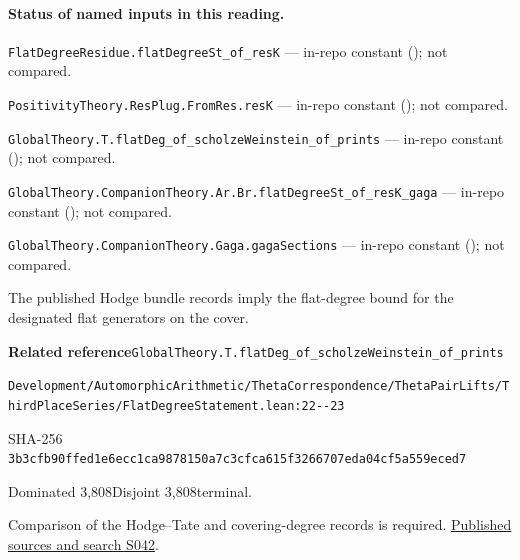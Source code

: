

\paragraph{Status of named inputs in this reading.}
\noindent\nolinkurl{FlatDegreeResidue.flatDegreeSt_of_resK} --- in-repo constant (); not compared.\par
\noindent\nolinkurl{PositivityTheory.ResPlug.FromRes.resK} --- in-repo constant (); not compared.\par
\noindent\nolinkurl{GlobalTheory.T.flatDeg_of_scholzeWeinstein_of_prints} --- in-repo constant (); not compared.\par
\noindent\nolinkurl{GlobalTheory.CompanionTheory.Ar.Br.flatDegreeSt_of_resK_gaga} --- in-repo constant (); not compared.\par
\noindent\nolinkurl{GlobalTheory.CompanionTheory.Gaga.gagaSections} --- in-repo constant (); not compared.\par

\begin{formalstatement}[D443]\label{decomp:D443}
The published Hodge bundle records imply the flat-degree bound for the designated flat generators on the cover.
\end{formalstatement}
{\small\raggedright\noindent\textsf{\bfseries Related reference}\quad \nolinkurl{GlobalTheory.T.flatDeg_of_scholzeWeinstein_of_prints}\par\noindent \nolinkurl{Development/AutomorphicArithmetic/ThetaCorrespondence/ThetaPairLifts/ThirdPlaceSeries/FlatDegreeStatement.lean:22--23}\par\noindent SHA-256 \nolinkurl{3b3cfb90ffed1e6ecc1ca9878150a7c3cfca615f3266707eda04cf5a559eced7}\par\noindent Dominated 3,808\quad Disjoint 3,808\quad terminal.\par}
Comparison of the Hodge–Tate and covering-degree records is required.
\hyperref[lit:S042]{Published sources and search S042}.
